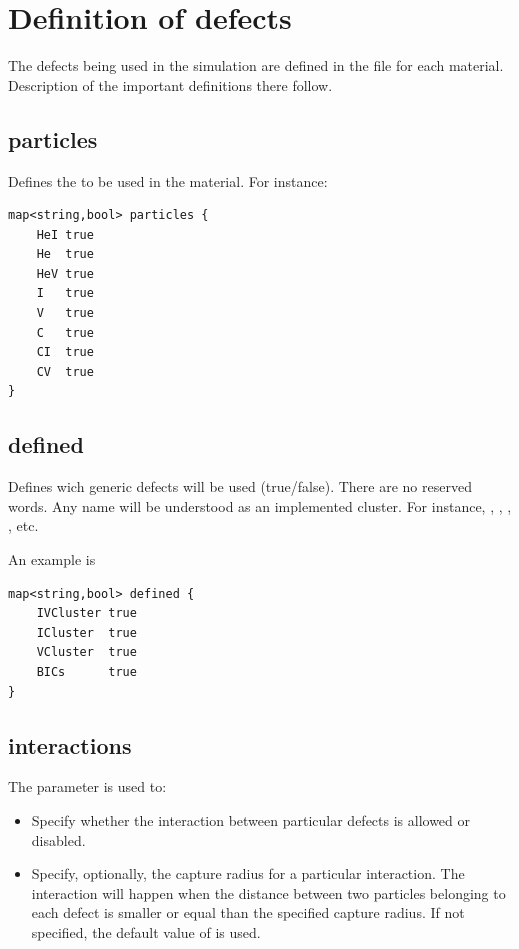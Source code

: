 \section{Definition of defects}

The defects being used in the simulation are defined in the  file for each material. Description of the important definitions there follow.

\subsection{particles}

Defines the  to be used in the material. For instance:
\begin{lstlisting}
map<string,bool> particles { 
	HeI true 
	He  true
	HeV true
	I   true
	V   true
	C   true
	CI  true
	CV  true
}
\end{lstlisting}

\subsection{defined}
Defines wich generic defects will be used (true/false). There are no reserved words. Any name will be understood as an implemented cluster. For instance, , , , , etc.

An example is
\begin{lstlisting}
map<string,bool> defined { 
	IVCluster true 
	ICluster  true
	VCluster  true
	BICs      true
}
\end{lstlisting}

\subsection{interactions}

The parameter  is used to:
\begin{itemize}
\item {} Specify whether the interaction between particular defects is allowed or disabled. 
\item {} Specify, optionally, the capture radius for a particular interaction. The interaction will happen when the distance between two particles belonging to each defect is smaller or equal than the specified capture radius. If not specified, the default value of  is used.
\end{itemize}

